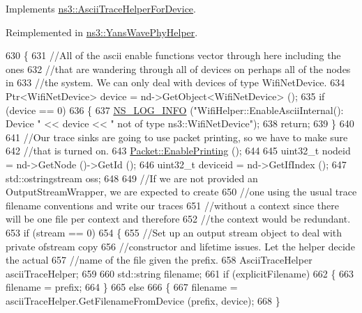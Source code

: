 Implements \hyperlink{classns3_1_1AsciiTraceHelperForDevice_ab0eb42de1633994e75f4a4fd44bc79de}{ns3\+::\+Ascii\+Trace\+Helper\+For\+Device}.



Reimplemented in \hyperlink{classns3_1_1YansWavePhyHelper_ad015eeeabbdf7522d52de94d22fcc207}{ns3\+::\+Yans\+Wave\+Phy\+Helper}.


\begin{DoxyCode}
630 \{
631   \textcolor{comment}{//All of the ascii enable functions vector through here including the ones}
632   \textcolor{comment}{//that are wandering through all of devices on perhaps all of the nodes in}
633   \textcolor{comment}{//the system. We can only deal with devices of type WifiNetDevice.}
634   Ptr<WifiNetDevice> device = nd->GetObject<WifiNetDevice> ();
635   \textcolor{keywordflow}{if} (device == 0)
636     \{
637       \hyperlink{group__logging_gafbd73ee2cf9f26b319f49086d8e860fb}{NS\_LOG\_INFO} (\textcolor{stringliteral}{"WifiHelper::EnableAsciiInternal(): Device "} << device << \textcolor{stringliteral}{" not of type
       ns3::WifiNetDevice"});
638       \textcolor{keywordflow}{return};
639     \}
640 
641   \textcolor{comment}{//Our trace sinks are going to use packet printing, so we have to make sure}
642   \textcolor{comment}{//that is turned on.}
643   \hyperlink{classns3_1_1Packet_ae17c0cd8e63e83df3c9273801e3d5d7f}{Packet::EnablePrinting} ();
644 
645   uint32\_t nodeid = nd->GetNode ()->GetId ();
646   uint32\_t deviceid = nd->GetIfIndex ();
647   std::ostringstream oss;
648 
649   \textcolor{comment}{//If we are not provided an OutputStreamWrapper, we are expected to create}
650   \textcolor{comment}{//one using the usual trace filename conventions and write our traces}
651   \textcolor{comment}{//without a context since there will be one file per context and therefore}
652   \textcolor{comment}{//the context would be redundant.}
653   \textcolor{keywordflow}{if} (stream == 0)
654     \{
655       \textcolor{comment}{//Set up an output stream object to deal with private ofstream copy}
656       \textcolor{comment}{//constructor and lifetime issues. Let the helper decide the actual}
657       \textcolor{comment}{//name of the file given the prefix.}
658       AsciiTraceHelper asciiTraceHelper;
659 
660       std::string filename;
661       \textcolor{keywordflow}{if} (explicitFilename)
662         \{
663           filename = prefix;
664         \}
665       \textcolor{keywordflow}{else}
666         \{
667           filename = asciiTraceHelper.GetFilenameFromDevice (prefix, device);
668         \}

\end{DoxyCode}
